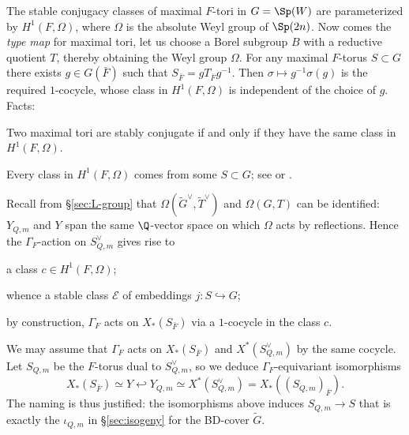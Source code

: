 \documentclass[a4paper,10pt]{article}
\begin{document}
The stable conjugacy classes of maximal $F$-tori in $G = \Sp(W)$ are parameterized by $H^1(F, \Omega)$, where $\Omega$ is the absolute Weyl group of $\Sp(2n)$. Now comes the \emph{type map} for maximal tori, let us choose a Borel subgroup $B$ with a reductive quotient $T$, thereby obtaining the Weyl group $\Omega$. For any maximal $F$-torus $S \subset G$ there exists $g \in G(\bar{F})$ such that $S_{\bar{F}} = g T_{\bar{F}} g^{-1}$. Then $\sigma \mapsto g^{-1}\sigma(g)$ is the required $1$-cocycle, whose class in $H^1(F, \Omega)$ is independent of the choice of $g$. Facts:
\begin{inparaenum}[(a)]
	\item Two maximal tori are stably conjugate if and only if they have the same class in $H^1(F, \Omega)$.
	\item Every class in $H^1(F, \Omega)$ comes from some $S \subset G$; see \cite[\S 3.2]{Kal16} or \cite[Theorem 1.1]{Rag04}.
\end{inparaenum}

Recall from \S\ref{sec:L-group} that $\Omega(\tilde{G}^\vee, \tilde{T}^\vee)$ and $\Omega(G,T)$ can be identified: $Y_{Q,m}$ and $Y$ span the same $\Q$-vector space on which $\Omega$ acts by reflections. Hence the $\Gamma_F$-action on $S_{Q,m}^\vee$ gives rise to
\begin{inparaenum}[(i)]
	\item a class $c \in H^1(F, \Omega)$;
	\item whence a stable class $\mathcal{E}$ of embeddings $j: S \hookrightarrow G$;
	\item by construction, $\Gamma_F$ acts on $X_*(S_{\bar{F}})$ via a $1$-cocycle in the class $c$.
\end{inparaenum}
We may assume that $\Gamma_F$ acts on $X_*(S_{\bar{F}})$ and $X^*(S_{Q,m}^\vee)$ by the same cocycle. Let $S_{Q,m}$ be the $F$-torus dual to $S_{Q,m}^\vee$, so we deduce $\Gamma_F$-equivariant isomorphisms
\[ X_*(S_{\bar{F}}) \simeq Y \hookleftarrow Y_{Q,m} \simeq X^*(S_{Q,m}^\vee) = X_*((S_{Q,m})_{\bar{F}}). \]
The naming is thus justified: the isomorphisms above induces $S_{Q,m} \to S$ that is exactly the $\iota_{Q,m}$ in \S\ref{sec:isogeny} for the BD-cover $\tilde{G}$.
\end{document}
